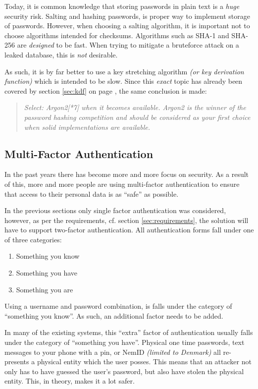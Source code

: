 			Today, it is common knowledge that storing passwords in plain text is a \emph{huge} security risk. Salting and hashing passwords, is proper way to implement storage of passwords. However, when choosing a salting algorithm, it is important not to choose algorithms intended for checksums. Algorithms such as SHA-1 and SHA-256 are \emph{designed} to be fast. When trying to mitigate a bruteforce attack on a leaked database, this is \emph{not} desirable.

			As such, it is by far better to use a key stretching algorithm \emph{(or key derivation function)} which is intended to be slow. Since this \emph{exact} topic has already been covered by section \ref{sec:kdf} on page \pageref{sec:kdf}, the same conclusion is made:

			\begin{quote}
				\emph{Select:
					Argon2[*7] when it becomes available. Argon2 is the winner of the password hashing competition and should be considered as your first choice when solid implementations are available.
				}\\\cite{owasp_kdf}
			\end{quote}

		\subsection{Multi-Factor Authentication}
			\label{sec:mfa}
			In the past years there has become more and more focus on security. As a result of this, more and more people are using multi-factor authentication to ensure that access to their personal data is as ``safe'' as possible. 

			In the previous sections only single factor authentication was considered, however, as per the requirements, cf. section \ref{sec:requirements}, the solution will have to support two-factor authentication. All authentication forms fall under one of three categories:
			\begin{enumerate}
				\item Something you know
				\item Something you have
				\item Something you are
			\end{enumerate}
			Using a username and password combination, is falls under the category of ``something you know''. As such, an additional factor needs to be added. 

			In many of the existing systems, this ``extra'' factor of authentication usually falls under the category of ``something you have''. Physical one time passwords, text messages to your phone with a pin, or NemID \emph{(limited to Denmark)} all re-presents a physical entity which the user posses. This means that an attacker not only has to have guessed the user's password, but also have stolen the physical entity. This, in theory, makes it a lot safer.

